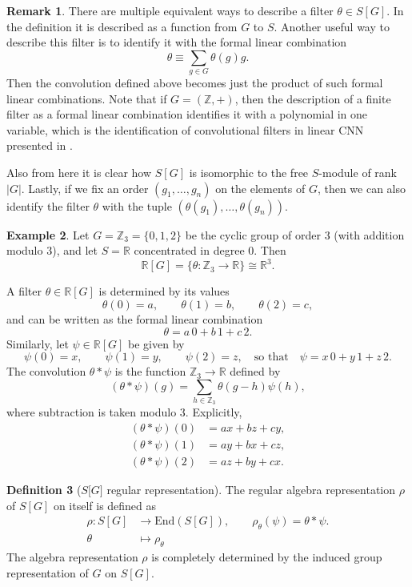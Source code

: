\documentclass[final]{article}
\newcommand{\R}{\mathbb{R}}
\newcommand{\Z}{\mathbb{Z}}
\newcommand{\End}{\text{End}}
\newcommand{\conv}{\ast}
\theoremstyle{definition}
\newtheorem{definition}{Definition}[section] %
\newtheorem{example}[definition]{Example}
\newtheorem{remark}[definition]{Remark}
\theoremstyle{plain}
\begin{document}
\begin{remark}
    There are multiple equivalent ways to describe a filter $\theta \in S[G]$.
    In the definition it is described as a function from $G$ to $S$.
    Another useful way to describe this filter is to identify it with the formal linear combination 
    \[
    \theta \equiv \sum_{g\in G}\theta(g) g.
    \]
    Then the convolution defined above becomes just the product of such formal linear combinations.
    Note that if $G=(\Z, +)$, then the description of a finite filter as a formal linear combination identifies it with a polynomial in one variable, which is the identification of convolutional filters in linear CNN presented in \cite{kohn2022geometrylinearconvolutionalnetworks}.
    
    Also from here it is clear how $S[G]$ is isomorphic to the free $S$-module of rank ${|G|}$.
    Lastly, if we fix an order $(g_1, \dots, g_n)$ on the elements of $G$, then we can also identify the filter $\theta$ with the tuple $(\theta(g_1), \dots, \theta(g_n))$.
\end{remark}

\begin{example}
Let $G = \Z_3 = \{0,1,2\}$ be the cyclic group of order $3$ (with addition modulo $3$),
and let $S = \R$ concentrated in degree $0$.
Then
\[
\R[G] = \{ \theta : \Z_3 \to \R \} \cong \R^3.
\]

A filter $\theta \in \R[G]$ is determined by its values
\[
\theta(0)=a,\qquad \theta(1)=b,\qquad \theta(2)=c,
\]
and can be written as the formal linear combination
\[
\theta = a\,0 + b\,1 + c\,2.
\]
Similarly, let $\psi \in \R[G]$ be given by
\[
\psi(0)=x,\qquad \psi(1)=y,\qquad \psi(2)=z,
\quad\text{so that}\quad
\psi = x\,0 + y\,1 + z\,2.
\]
The convolution $\theta \conv \psi$ is the function $\Z_3 \to \R$ defined by
\[
(\theta \conv \psi)(g) = \sum_{h\in \Z_3} \theta(g-h)\psi(h),
\]
where subtraction is taken modulo $3$.
Explicitly,
\begin{align*}
(\theta \conv \psi)(0) &= a x + b z + c y,\\
(\theta \conv \psi)(1) &= a y + b x + c z,\\
(\theta \conv \psi)(2) &= a z + b y + c x.
\end{align*}
\end{example}

\begin{definition}[$S\lbrack G\rbrack$ regular representation]
The regular algebra representation $\rho$ of $S[G]$ on itself is defined as
\begin{align*}
\rho : S[G] &\to \End(S[G]), \qquad \rho_\theta(\psi) = \theta \conv \psi .\\
\theta &\mapsto \rho_\theta
\end{align*}
The algebra representation $\rho$ is completely determined by the induced group representation of $G$ on $S[G]$.
\end{definition}
\end{document}
